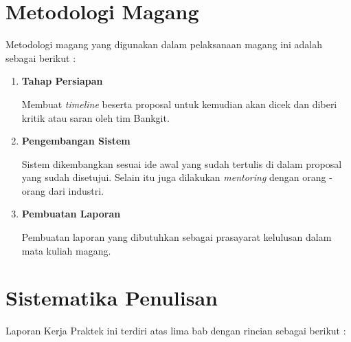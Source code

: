 \section{Metodologi Magang}

Metodologi magang yang digunakan dalam pelaksanaan magang ini adalah sebagai berikut :

\begin{enumerate}[nolistsep]

      \item \textbf{Tahap Persiapan}

            Membuat \textit{timeline} beserta proposal untuk kemudian akan dicek dan diberi kritik atau saran oleh tim Bankgit.

      \item \textbf{Pengembangan Sistem}

            Sistem dikembangkan sesuai ide awal yang sudah tertulis di dalam proposal yang sudah disetujui. Selain itu juga dilakukan \textit{mentoring} dengan orang - orang dari industri.

      \item \textbf{Pembuatan Laporan}

            Pembuatan laporan yang dibutuhkan sebagai prasayarat kelulusan dalam mata kuliah magang.

\end{enumerate}

\section{Sistematika Penulisan}

Laporan Kerja Praktek ini terdiri atas lima bab dengan rincian sebagai berikut :
\vspace{0.5ex}

